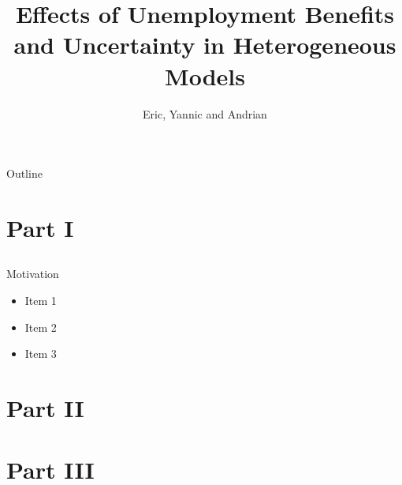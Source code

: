 \documentclass{beamer}
\title{Effects of Unemployment Benefits and Uncertainty in Heterogeneous Models}
\subtitle{}
\author{Eric, Yannic and Andrian}
\begin{document}
\begin{frame}
  \titlepage
\end{frame}

\begin{frame}{Outline}
  \tableofcontents
\end{frame}

\section{Part I}
\subsection{}
\begin{frame}{Motivation}
  \begin{itemize}

  \item {
  Item 1
  }

  \item {
  Item 2  
  }

  \item {
  Item 3
  }
  \end{itemize}

\end{frame}

\section{Part II}
\subsection{}

\section{Part III}
\subsection{}
\end{document}
